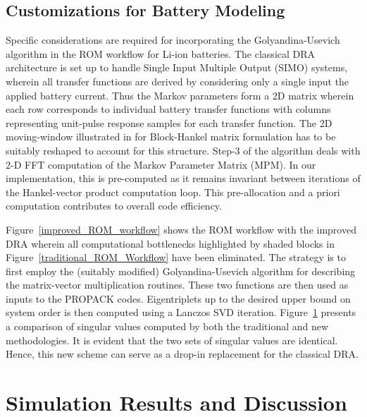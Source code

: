\subsection{Customizations for Battery Modeling}

Specific considerations are required for incorporating the Golyandina-Usevich
algorithm in the ROM workflow for Li-ion batteries. The classical
DRA architecture is set up to handle Single Input Multiple Output
(SIMO) systems, wherein all transfer functions are derived by considering
only a single input \textendash{} the applied battery current. Thus
the Markov parameters form a 2D matrix wherein each row corresponds
to individual battery transfer functions with columns representing
unit-pulse response samples for each transfer function. The 2D moving-window
illustrated in \citep{GolyandinaKorobeynikovShlemovEtAl2015} for
Block-Hankel matrix formulation has to be suitably reshaped to account
for this structure. Step-3 of the algorithm deals with 2-D FFT computation
of the Markov Parameter Matrix (MPM). In our implementation, this
is pre-computed as it remains invariant between iterations of the
Hankel-vector product computation loop. This pre-allocation and a
priori computation contributes to overall code efficiency.

Figure~\ref{improved_ROM_workflow} shows the ROM workflow with
the improved DRA wherein all computational bottlenecks highlighted
by shaded blocks in Figure~\ref{traditional_ROM_Workflow} have
been eliminated. The strategy is to first employ the (suitably modified)
Golyandina-Usevich algorithm for describing the matrix-vector multiplication
routines. These two functions are then used as inputs to the PROPACK
codes. Eigentriplets up to the desired upper bound on system order
is then computed using a Lanczos SVD iteration. Figure~\ref{svdcompare}
presents a comparison of singular values computed by both the  traditional
and new methodologies. It is evident that the two sets of singular
values are identical. Hence, this new scheme can serve as a drop-in
replacement for the classical DRA.

\begin{figure}
	\caption{}
	\label{svdcompare}
\end{figure}

\section{Simulation Results and Discussion\label{sec:Results} }

